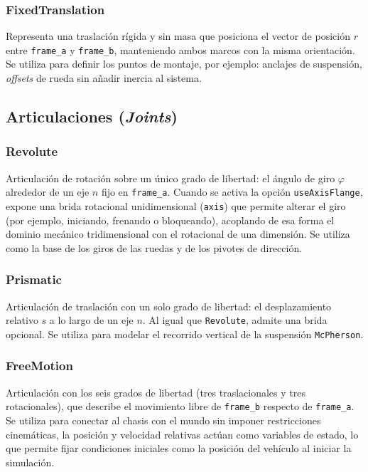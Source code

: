 \subsubsection{FixedTranslation}
Representa una traslación rígida y sin masa que posiciona el vector de posición $r$ entre \verb|frame_a| y \verb|frame_b|, manteniendo ambos marcos con la misma orientación. Se utiliza para definir los puntos de montaje, por ejemplo: anclajes de suspensión, \textit{offsets} de rueda sin añadir inercia al sistema.


\subsection*{Articulaciones (\textit{Joints})}



\subsubsection{Revolute} 
Articulación de rotación sobre un único grado de libertad: el ángulo de giro $\varphi$ alrededor de un eje $n$ fijo en \verb|frame_a|. Cuando se activa la opción \verb|useAxisFlange|, expone una brida rotacional unidimensional (\verb|axis|) que permite alterar el giro (por ejemplo, iniciando, frenando o bloqueando), acoplando de esa forma el dominio mecánico tridimensional con el rotacional de una dimensión. Se utiliza como la base de los giros de las ruedas y de los pivotes de dirección.

\subsubsection{Prismatic} 
Articulación de traslación con un solo grado de libertad: el desplazamiento relativo $s$ a lo largo de un eje $n$. Al igual que \verb|Revolute|, admite una brida opcional. Se utiliza para modelar el recorrido vertical de la suspensión \verb|McPherson|.



\subsubsection{FreeMotion} 
Articulación con los seis grados de libertad (tres traslacionales y tres rotacionales), que describe el movimiento libre de \verb|frame_b| respecto de \verb|frame_a|. Se utiliza para conectar al chasis con el mundo sin imponer restricciones cinemáticas, la posición y velocidad relativas actúan como variables de estado, lo que permite fijar condiciones iniciales como la posición del vehículo al iniciar la simulación.



